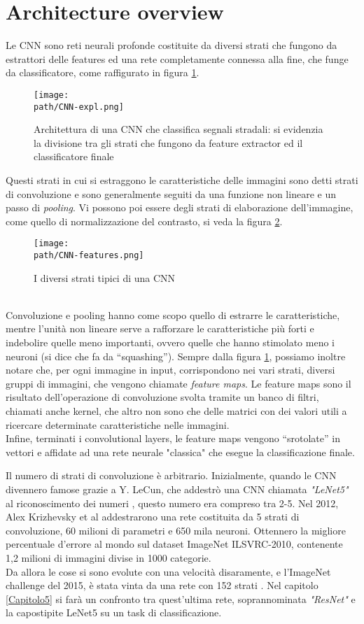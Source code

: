 \section{Architecture overview}
Le CNN sono reti neurali profonde costituite da diversi strati che fungono da estrattori delle features ed una rete completamente connessa alla fine, che funge da classificatore, come raffigurato in figura \ref{fig:cnn1}. \\
\begin{figure}[h!]
 \centering
 \texttt{[image: \\path/CNN-expl.png]} 
 \caption{Architettura di una CNN che classifica segnali stradali: si evidenzia la divisione tra gli strati che fungono da feature extractor ed il classificatore finale}
 \label{fig:cnn1}
\end{figure}
Questi strati in cui si estraggono le caratteristiche delle immagini sono detti strati di convoluzione e sono generalmente seguiti da una funzione non lineare e un passo di \emph{pooling}. Vi possono poi essere degli strati di elaborazione dell'immagine, come quello di normalizzazione del contrasto, si veda la figura \ref{fig:cnn2}.
\begin{figure}[h!]
 \centering
 \texttt{[image: \\path/CNN-features.png]} 
 \caption{I diversi strati tipici di una CNN}
 \label{fig:cnn2}
\end{figure}
\\
Convoluzione e pooling hanno come scopo quello di estrarre le caratteristiche, mentre l’unità non lineare serve a rafforzare le caratteristiche più forti e indebolire quelle meno importanti, ovvero quelle che hanno stimolato meno i neuroni (si dice che fa da “squashing”). Sempre dalla figura \ref{fig:cnn1}, possiamo inoltre notare che, per ogni immagine in input, corrispondono nei vari strati, diversi gruppi di immagini, che vengono chiamate \emph{feature maps}. Le feature maps sono il risultato dell'operazione di convoluzione svolta tramite un banco di filtri, chiamati anche kernel, che altro non sono che delle matrici con dei valori utili a ricercare determinate caratteristiche nelle immagini.\\
Infine, terminati i convolutional layers, le feature maps vengono “srotolate” in vettori e affidate ad una rete neurale "classica" che esegue la classificazione finale. 

Il numero di strati di convoluzione è arbitrario. Inizialmente, quando le CNN divennero famose grazie a Y. LeCun, che addestrò una CNN chiamata \emph{"LeNet5"} al riconoscimento dei numeri \parencite{lenet}, questo numero era compreso tra 2-5. Nel 2012, Alex Krizhevsky et al \parencite{imagenet2012} addestrarono una rete costituita da 5 strati di convoluzione, 60 milioni di parametri e 650 mila neuroni. Ottennero la migliore percentuale d'errore al mondo sul dataset ImageNet ILSVRC-2010, contenente 1,2 milioni di immagini divise in 1000 categorie. \\
Da allora le cose si sono evolute con una velocità disaramente, e l'ImageNet challenge del 2015, è stata vinta da una rete con 152 strati \parencite{resnet}. Nel capitolo \ref{Capitolo5} si farà un confronto tra quest'ultima rete, soprannominata \emph{"ResNet"} e la capostipite LeNet5 su un task di classificazione.   

